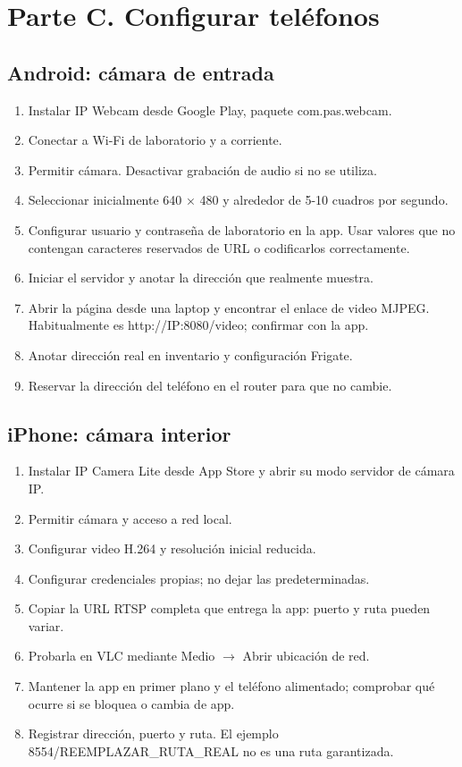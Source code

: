 \documentclass[12pt,a4paper]{article}
\begin{document}
\section*{Parte C. Configurar teléfonos}
\subsection*{Android: cámara de entrada}
\begin{enumerate}
\item Instalar IP Webcam desde Google Play, paquete \textnormal{com.pas.webcam}.
\item Conectar a Wi-Fi de laboratorio y a corriente.
\item Permitir cámara. Desactivar grabación de audio si no se utiliza.
\item Seleccionar inicialmente 640 × 480 y alrededor de 5-10 cuadros por segundo.
\item Configurar usuario y contraseña de laboratorio en la app. Usar valores que no contengan caracteres reservados de URL o codificarlos correctamente.
\item Iniciar el servidor y anotar la dirección que realmente muestra.
\item Abrir la página desde una laptop y encontrar el enlace de video MJPEG. Habitualmente es \textnormal{http:/\allowbreak{}/\allowbreak{}IP:8080/\allowbreak{}video}; confirmar con la app.
\item Anotar dirección real en inventario y configuración Frigate.
\item Reservar la dirección del teléfono en el router para que no cambie.
\end{enumerate}
\subsection*{iPhone: cámara interior}
\begin{enumerate}
\item Instalar IP Camera Lite desde App Store y abrir su modo servidor de cámara IP.
\item Permitir cámara y acceso a red local.
\item Configurar video H.264 y resolución inicial reducida.
\item Configurar credenciales propias; no dejar las predeterminadas.
\item Copiar la URL RTSP completa que entrega la app: puerto y ruta pueden variar.
\item Probarla en VLC mediante Medio \(\rightarrow\) Abrir ubicación de red.
\item Mantener la app en primer plano y el teléfono alimentado; comprobar qué ocurre si se bloquea o cambia de app.
\item Registrar dirección, puerto y ruta. El ejemplo \textnormal{8554/\allowbreak{}REEMPLAZAR\_\allowbreak{}RUTA\_\allowbreak{}REAL} no es una ruta garantizada.
\end{enumerate}
\end{document}
